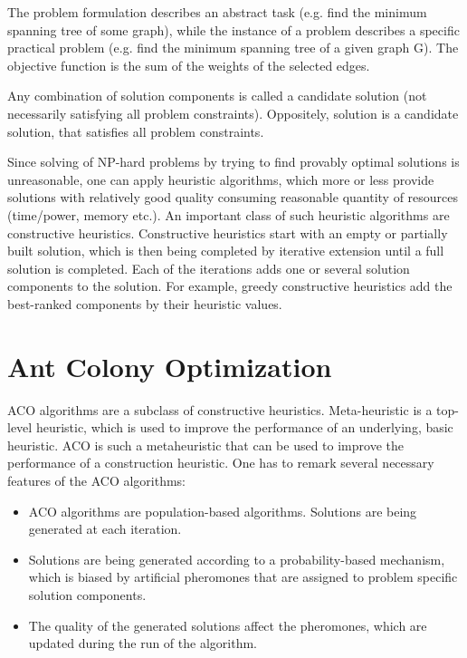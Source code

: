 \documentclass[11pt,a4paper,oneside]{book}
\begin{document}
The problem formulation describes an abstract task (e.g. find the minimum spanning tree of some graph), while the instance of a problem describes a specific practical problem (e.g. find the minimum spanning tree of a given graph G). The objective function is the sum of the weights of the selected edges. \par

Any combination of solution components is called a candidate solution (not necessarily satisfying all problem constraints). Oppositely, solution is a candidate solution, that satisfies all problem constraints.

Since solving of NP-hard problems by trying to find provably optimal solutions is unreasonable, one can apply heuristic algorithms, which more or less provide solutions with relatively good quality consuming reasonable quantity of resources (time/power, memory etc.). An important class of such heuristic algorithms are constructive heuristics. Constructive heuristics start with an empty or partially built solution, which is then being completed by iterative extension until a full solution is completed. Each of the iterations adds one or several solution components to the solution. For example, greedy constructive heuristics  add the best-ranked components by their heuristic values.




\section{Ant Colony Optimization}

ACO algorithms are a subclass of constructive heuristics. Meta-heuristic is a top-level heuristic, which is used to improve the performance of an underlying, basic heuristic. ACO is such a metaheuristic that can be used to improve the performance of a construction heuristic. One has to remark several necessary features of the ACO algorithms:

\begin{itemize}
\item ACO algorithms are population-based algorithms. Solutions are being generated at each iteration.
\item Solutions are being generated according to a probability-based mechanism, which is biased by artificial pheromones that are assigned to problem specific solution components.
\item The quality of the generated solutions affect the pheromones, which are updated during the run of the algorithm.
\end{itemize}
\end{document}
